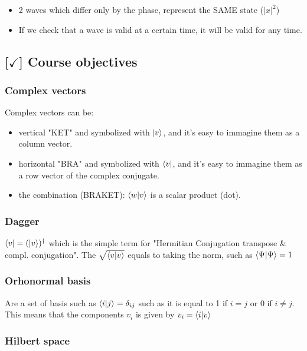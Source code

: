 \begin{itemize}
    \item 2 waves which differ only by the phase, represent the SAME state ($|x|^2$)
    \item If we check that a wave is valid at a certain time, it will be valid for any time.
\end{itemize}

\subsection{[$\checkmark$] Course objectives}

\subsubsection{Complex vectors} 

Complex vectors can be:

\begin{itemize}
    \item vertical "KET" and symbolized with $\ket{v}$, and it's easy to immagine them as a column vector.
    \item horizontal "BRA" and symbolized with $\bra{v}$, and it's easy to immagine them as a row vector of the complex conjugate.
    \item the combination (BRAKET): $\braket{w|v}$ is a scalar product (dot).
\end{itemize}

\subsubsection{Dagger}

$\bra{v} = (\ket{v})^{\dagger}$ which is the simple term for "Hermitian Conjugation transpose \& compl. conjugation".
The $\sqrt{\braket{v|v}}$ equals to taking the norm, such as $\braket{\Psi|\Psi} = 1$

\subsubsection{Orhonormal basis}

Are a set of basis such as $\braket{i|j} = \delta_{ij}$ such as it is equal to 1 if $i = j$ or 0 if $i\neq j$. This means that the components $v_i$ is given by $v_i = \braket{i|v}$ 

\subsubsection{Hilbert space}

